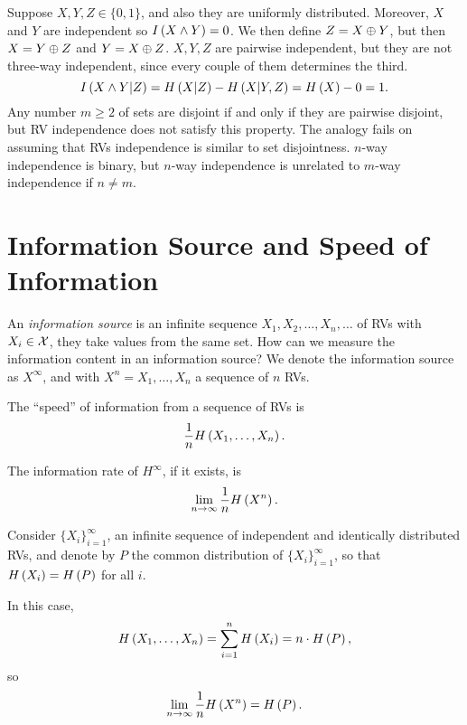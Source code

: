Suppose $X, Y, Z \in \{0, 1\}$, and also they are uniformly distributed.
Moreover, $X$ and $Y$ are independent so $I \left( {X \land Y} \right) = 0$.
We then define $Z = X \oplus Y$, but then $X = Y \oplus Z$ and $Y = X \oplus Z$.
$X, Y, Z$ are pairwise independent, but they are not three-way independent, since every couple of them determines the third.
\begin{equation*}
	I \left( {X \land Y | Z} \right)
	=
	H\left({X | Z}\right) - H\left({X | Y, Z}\right)
	=
	H\left({X}\right) - 0
	= 1.
\end{equation*}
Any number $m \ge 2$ of sets are disjoint if and only if they are pairwise disjoint, but \ac{RV} independence does not satisfy this property.
The analogy fails on assuming that \acp{RV} independence is similar to set disjointness.
$n$-way independence is binary, but $n$-way independence is unrelated to $m$-way independence if $n \neq m$.

\section{Information Source and Speed of Information}

An \emph{information source} is an infinite sequence $X_1, X_2, \dots, X_n, \dots$ of \acp{RV} with $X_i \in \mathcal{X}$, \ie they take values from the same set.
How can we measure the information content in an information source?
We denote the information source as $X^\infty$, and with $X^n = X_1, \dots, X_n$ a sequence of $n$ \acp{RV}.

The ``speed'' of information from a sequence of \acp{RV} is 
\begin{equation*}
	\frac{1}{n} H\left({X_1, \dots, X_n}\right).
\end{equation*}

The information rate of $H^\infty$, if it exists, is
\begin{equation*}
	\lim_{n \to \infty} \frac{1}{n} H\left({X^n}\right). 
\end{equation*}


Consider $\{X_i\}_{i = 1}^\infty$, an infinite sequence of independent and identically distributed \acp{RV}, and denote by $P$ the common distribution of $\{X_i\}_{i = 1}^\infty$, so that $H\left({X_i}\right) = H\left({P}\right)$ for all $i$.

In this case,
\begin{equation*}
	H\left({X_1, \dots, X_n}\right)
	=
	\sum_{i = 1}^n H\left({X_i}\right)
	=
	n \cdot H\left({P}\right),
\end{equation*}
so
\begin{equation*}
	\lim_{n \to \infty} \frac{1}{n} H\left({X^n}\right) = H\left({P}\right).
\end{equation*}

